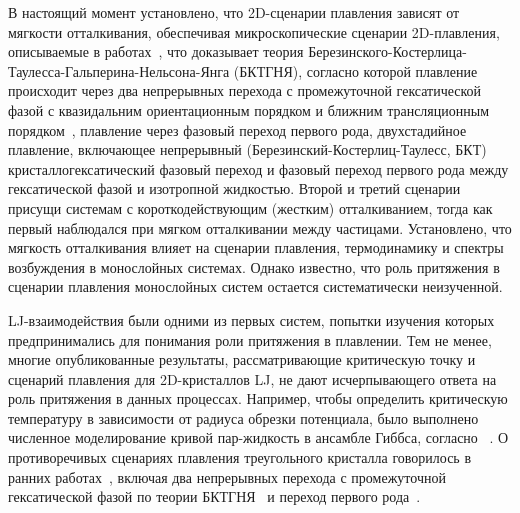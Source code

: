 В настоящий момент установлено, что 2D-сценарии плавления зависят от мягкости отталкивания, обеспечивая микроскопические сценарии 2D-плавления, описываемые в работах~\cite{10.3367/ufne.2017.06.038161, 10.3367/ufne.2018.04.038417}, что доказывает теория Березинского-Костерлица-Таулесса-Гальперина-Нельсона-Янга (БКТГНЯ), согласно которой плавление происходит через два непрерывных перехода с промежуточной гексатической фазой с квазидальним ориентационным порядком и ближним трансляционным порядком~\cite{10.1088/0022-3719/6/7/010, 10.1103/physrevlett.41.121, 10.1103/physrevb.19.2457, 10.1103/physrevb.19.1855}, плавление через фазовый переход первого рода, двухстадийное плавление, включающее непрерывный (Березинский-Костерлиц-Таулесс, БКТ) кристаллогексатический фазовый переход и фазовый переход первого рода между гексатической фазой и изотропной жидкостью.
Второй и третий сценарии присущи системам с короткодействующим (жестким) отталкиванием, тогда как первый наблюдался при мягком отталкивании между частицами. 
Установлено, что мягкость отталкивания влияет на сценарии плавления, термодинамику и спектры возбуждения в монослойных системах. 
Однако известно, что роль притяжения в сценарии плавления монослойных систем остается систематически неизученной.

LJ-взаимодействия были одними из первых систем, попытки изучения которых предпринимались для понимания роли притяжения в плавлении. 
Тем не менее, многие опубликованные результаты, рассматривающие критическую точку и сценарий плавления для 2D-кристаллов LJ, не дают исчерпывающего ответа на роль притяжения в данных процессах.
Например, чтобы определить критическую температуру в зависимости от радиуса обрезки потенциала, было выполнено численное моделирование кривой пар-жидкость в ансамбле Гиббса, согласно ~\cite{10.1063/1.460477}.
О противоречивых сценариях плавления треугольного кристалла говорилось в ранних работах~\cite{10.1103/physrevlett.42.1632, 10.1063/1.436526, 10.1103/physrevlett.44.463, 10.1063/1.441901, 10.1103/physrevlett.52.449, 10.1103/physrevb.30.2755}, включая два непрерывных перехода с промежуточной гексатической фазой по теории БКТГНЯ~\cite{10.1103/physrevlett.42.1632} и переход первого рода~\cite{10.1063/1.436526, 10.1103/physrevlett.44.463, 10.1063/1.441901, 10.1103/physrevlett.52.449}.

